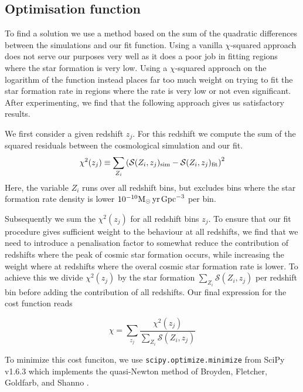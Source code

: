 \documentclass[twocolumn]{aastex631}
\newcommand{\Msun}{\ensuremath{\rm{M}_{\odot}}\xspace}
\newcommand{\yr}{\ensuremath{\,\rm{yr}}\xspace}
\newcommand{\Mpc}{\ensuremath{\,\rm{Gpc}}\xspace}
\begin{document}
\subsection{Optimisation function}
To find a solution we use a method based on the sum of the quadratic differences between the simulations and our fit function. Using a vanilla $\chi$-squared approach does not serve our purposes very well as it does a poor job in fitting regions where the star formation is very low.  Using a $\chi$-squared approach on the logarithm of the function instead places far too much weight on trying to fit the star formation rate in regions where the rate is very low or not even significant.  After experimenting, we find that the following approach gives us satisfactory results. 

We first consider a given redshift $z_j$.  For this redshift we compute the sum of the squared residuals between the cosmological simulation and our fit.  
%
\begin{equation}
\label{eq: chisquare}
    \chi^2 (z_j) \equiv \sum_{Z_i} \left( 
        \mathcal{S}(Z_i,z_j)_{\rm sim} - 
        \mathcal{S}(Z_i,z_j)_{\rm fit}\right)^2
\end{equation}
%
Here, the variable $Z_i$ runs over all redshift bins, but excludes bins where the star formation rate density is lower $10^{-10} \Msun \yr \Mpc^{-3}$ per bin. 

Subsequently we sum the $\chi^2 (z_j)$ for all redshift bins $z_j$. To ensure that our fit procedure gives sufficient weight to the behaviour at all redshifts, we find that we need to introduce a penalisation factor to somewhat reduce the contribution of redshifts where the peak of cosmic star formation occurs, while increasing the weight where at redshifts where the overal cosmic star formation rate is lower.  To achieve this we divide $\chi^2 (z_j)$ by the star formation $\sum_{Z_i} \mathcal{S}(Z_i,z_j)$ per redshift bin before adding the contribution of all redshifts.  Our final expression for the cost function reads

\begin{equation}
\label{eq: cost function}
    \chi  = \sum_{z_j} \frac{ \chi^2 (z_j) } 
        {\sum_{Z_i} \mathcal{S}(Z_i,z_j)}
\end{equation}

To minimize this cost funciton, we use \texttt{scipy.optimize.minimize} from SciPy v1.6.3 which implements the quasi-Newton method of Broyden, Fletcher, Goldfarb, and Shanno \citep[BFGS,][]{NocedalWright_numerical_optimization}. 
\end{document}
